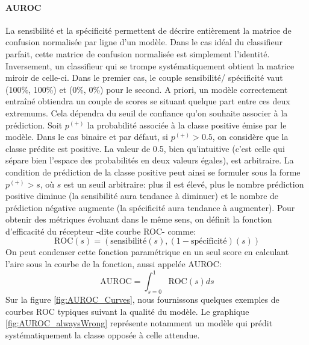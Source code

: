 \paragraph{\ac{AUROC}} La sensibilité et la spécificité permettent de décrire entièrement la matrice de confusion normalisée par ligne d'un modèle. Dans le cas idéal du classifieur parfait, cette matrice de confusion normalisée est simplement l'identité. Inversement, un classifieur qui se trompe systématiquement obtient la matrice miroir de celle-ci. Dans le premier cas, le couple sensibilité/ spécificité vaut (100\%, 100\%) et (0\%, 0\%) pour le second. A priori, un modèle correctement entraîné obtiendra un couple de scores se situant quelque part entre ces deux extremums. Cela dépendra du seuil de confiance qu'on souhaite associer à la prédiction. Soit $p^{(+)}$ la probabilité associée à la classe positive émise par le modèle. Dans le cas binaire et par défaut, si $p^{(+)}>0.5$, on considère que la classe prédite est positive. La valeur de 0.5, bien qu'intuitive (c'est celle qui sépare bien l'espace des probabilités en deux valeurs égales), est arbitraire. La condition de prédiction de la classe positive peut ainsi se formuler sous la forme $p^{(+)}>s$, où $s$ est un seuil arbitraire: plus il est élevé, plus le nombre prédiction positive diminue (la sensibilité aura tendance à diminuer) et le nombre de prédiction négative augmente (la spécificité aura tendance à augmenter). Pour obtenir des métriques évoluant dans le même sens, on définit la fonction d'efficacité du récepteur -dite courbe ROC- comme:
\begin{equation}
	\text{ROC}(s) = (\text{sensibilité}(s), (1-\text{spécificité})(s))
\end{equation}
On peut condenser cette fonction paramétrique en un seul score en calculant l'aire sous la courbe de la fonction, aussi appelée  \ac{AUROC}:
\begin{equation}
	\text{AUROC} = \int_{s=0}^{1}\text{ROC}(s)ds
\end{equation}
Sur la figure \ref{fig:AUROC_Curves}, nous fournissons quelques exemples de courbes ROC typiques suivant la qualité du modèle. Le graphique \ref{fig:AUROC_alwaysWrong} représente notamment un modèle qui prédit systématiquement la classe opposée à celle attendue.

